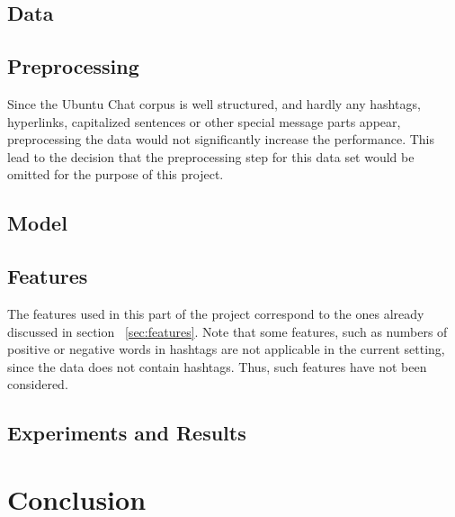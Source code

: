 \documentclass{article} %
\begin{document}
\subsection{Data}



\subsection{Preprocessing}

Since the Ubuntu Chat corpus is well structured, and hardly any hashtags, hyperlinks, capitalized sentences or other special message parts appear, preprocessing the data would not significantly increase the performance. This lead to the decision that the preprocessing step for this data set would be omitted for the purpose of this project.


\subsection{Model}



\subsection{Features}

\noindent The features used in this part of the project correspond to the ones already discussed in section ~\ref{sec:features}. Note that some features, such as numbers of positive or negative words in hashtags are not applicable in the current setting, since the data does not contain hashtags. Thus, such features have not been considered. 


\subsection{Experiments and Results}



\section{Conclusion}

\end{document}
